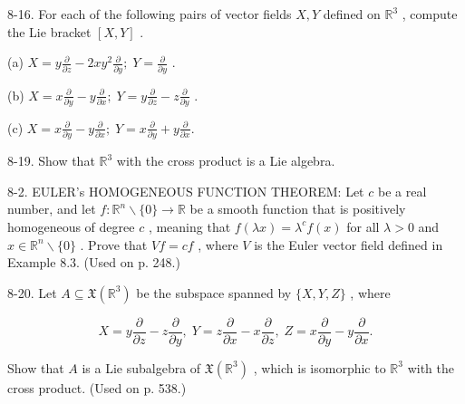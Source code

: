 \begin{exercise}
\label{prob:8-16}


8-16. For each of the following pairs of vector fields $X, Y$ defined on ${\mathbb{R}}^{3}$ , compute the Lie bracket $\left\lbrack  {X, Y}\right\rbrack$ .

(a) $X = y\frac{\partial }{\partial z} - {2x}{y}^{2}\frac{\partial }{\partial y};\;Y = \frac{\partial }{\partial y}$ .

(b) $X = x\frac{\partial }{\partial y} - y\frac{\partial }{\partial x};\;Y = y\frac{\partial }{\partial z} - z\frac{\partial }{\partial y}$ .

(c) $X = x\frac{\partial }{\partial y} - y\frac{\partial }{\partial x};\;Y = x\frac{\partial }{\partial y} + y\frac{\partial }{\partial x}.$
\end{exercise}

\begin{exercise}
\label{prob:8-19}


8-19. Show that ${\mathbb{R}}^{3}$ with the cross product is a Lie algebra.
\end{exercise}

\begin{exercise}
\label{prob:8-2}


8-2. EULER's HOMOGENEOUS FUNCTION THEOREM: Let $c$ be a real number, and let $f : {\mathbb{R}}^{n} \smallsetminus  \{ 0\}  \rightarrow  \mathbb{R}$ be a smooth function that is positively homogeneous of degree $c$ , meaning that $f\left( {\lambda x}\right)  = {\lambda }^{c}f\left( x\right)$ for all $\lambda  > 0$ and $x \in  {\mathbb{R}}^{n} \smallsetminus  \{ 0\}$ . Prove that ${Vf} = {cf}$ , where $V$ is the Euler vector field defined in Example 8.3. (Used on p. 248.)
\end{exercise}

\begin{exercise}
\label{prob:8-20}


8-20. Let $A \subseteq  \mathfrak{X}\left( {\mathbb{R}}^{3}\right)$ be the subspace spanned by $\{ X, Y, Z\}$ , where

\[
X = y\frac{\partial }{\partial z} - z\frac{\partial }{\partial y},\;Y = z\frac{\partial }{\partial x} - x\frac{\partial }{\partial z},\;Z = x\frac{\partial }{\partial y} - y\frac{\partial }{\partial x}.
\]

Show that $A$ is a Lie subalgebra of $\mathfrak{X}\left( {\mathbb{R}}^{3}\right)$ , which is isomorphic to ${\mathbb{R}}^{3}$ with the cross product. (Used on p. 538.)
\end{exercise}

